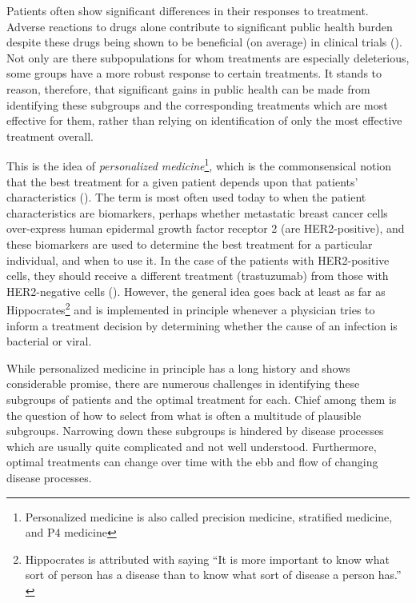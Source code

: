 \documentclass[12pt]{article}
\begin{document}

Patients often show significant differences in their responses to treatment. Adverse reactions to drugs alone contribute to significant public health burden despite these drugs being shown to be beneficial (on average) in clinical trials (\cite{Pirmohamed2004}). Not only are there subpopulations for whom treatments are especially deleterious, some groups have a more robust response to certain treatments. It stands to reason, therefore, that significant gains in public health can be made from identifying these subgroups and the corresponding treatments which are most effective for them, rather than relying on identification of only the most effective treatment overall.


This is the idea of \emph{personalized medicine}\footnote{Personalized medicine is also called precision medicine, stratified medicine, and P4 medicine}, which is the commonsensical notion that the best treatment for a given patient depends upon that patients' characteristics (\cite{pm-defn}). The term is most often used today to when the patient characteristics are biomarkers, perhaps whether metastatic breast cancer cells  over-express human epidermal growth factor receptor 2 (are HER2-positive), and these biomarkers are used to determine the best treatment for a particular individual, and when to use it. In the case of the patients with HER2-positive cells, they should receive a different treatment (trastuzumab) from those with HER2-negative cells (\cite{Baselga2006}).
However, the general idea goes back at least as far as Hippocrates\footnote{Hippocrates is attributed with saying “It is more important to know what sort of person has a disease than to know what sort of disease a person has.” \cite{Fischer2015}} and is implemented in principle whenever a physician tries to inform a treatment decision by determining whether the cause of an infection is bacterial or viral.

While personalized medicine in principle has a long history and shows considerable promise, there are numerous challenges in identifying these subgroups of patients and the optimal treatment for each. Chief among them is the question of how to select from what is often a multitude of plausible subgroups. Narrowing down these subgroups is hindered by disease processes which are usually quite complicated and not well understood. Furthermore, optimal treatments can change over time with the ebb and flow of changing disease processes.
\end{document}
